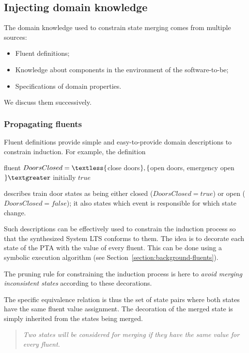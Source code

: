 
\subsection{Injecting domain knowledge\label{subsection:induction-pruning-with-domain-knowledge}}

The domain knowledge used to constrain state merging comes from multiple sources: 
\begin{itemize}
\item Fluent definitions;
\item Knowledge about components in the environment of the software-to-be;
\item Specifications of domain properties.
\end{itemize}
We discuss them successively.


\subsubsection*{Propagating fluents}

Fluent definitions provide simple and easy-to-provide domain descriptions to constrain induction. For example, the definition
\begin{center}
fluent $DoorsClosed = \textless \{$close doors$\}, \newline
 \{$open doors, emergency open$\} \textgreater $ initially $true$ \\
\end{center}
describes train door states as being either closed ($DoorsClosed = true$) or open ($DoorsClosed = false$); it also states which event is responsible for which state change. 

Such descriptions can be effectively used to constrain the induction process so that the synthesized System LTS conforms to them. The idea is to decorate each state of the PTA with the value of every fluent. This can be done using a symbolic execution algorithm \cite{Damas:2006, Damas:2011} (see Section~\ref{section:background-fluents}).

The pruning rule for constraining the induction process is here to \emph{avoid merging inconsistent states} according to these decorations. 

The specific equivalence relation is thus the set of state pairs where both states have the same fluent value assignment. The decoration of the merged state is simply inherited from the states being merged.
\begin{quote}
\emph{Two states will be considered for merging if they have the same value for every fluent.}
\end{quote}

